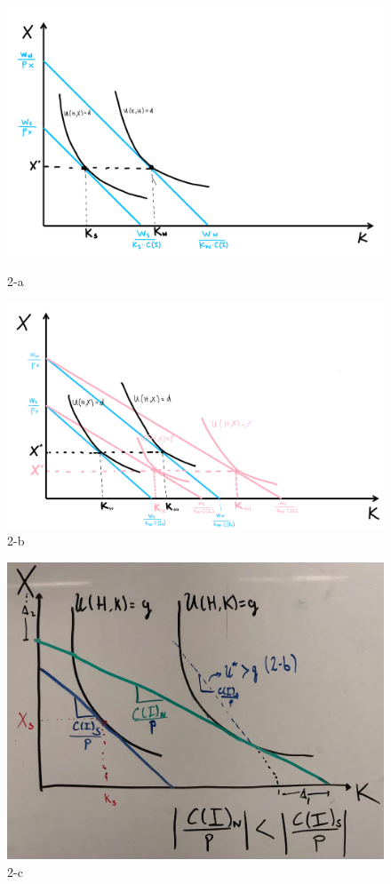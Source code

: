 \documentclass[12pt]{paper}
\begin{document}
\begin{figure}
\includegraphics[width=\textwidth]{2-a}
\caption{2-a}
\includegraphics[width=\textwidth]{2-b}
\caption{2-b}
\end{figure}
\begin{figure}
\includegraphics[width=\textwidth]{2-c}
\caption{2-c}

\end{figure}

\begin{align*}
\end{align*}
\end{document}
